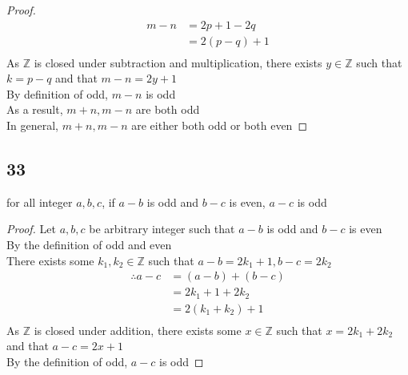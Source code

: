 \documentclass{article}
\begin{document}
\begin{proof}
    \begin{align*}
        m - n &= 2p + 1 - 2q\tag{By substitution}\\
        &= 2(p-q) +1\tag{By algebra}\\
    \end{align*}
    As $\mathbb{Z}$  is closed under subtraction and multiplication, there exists $y \in \mathbb{Z}$ such that $k = p-q$ and that $m - n = 2y + 1$\\
    By definition of odd, $m - n$ is odd\\
    As a result, $m+n,m-n$ are both odd\\
    In general, $m+n,m-n$ are either both odd or both even
\end{proof}

\subsection{33}
for all integer $a,b,c$, if $a-b$ is odd and $b-c$ is even, $a-c$ is odd
\begin{proof}
    Let $a,b,c$ be arbitrary integer such that $a-b$ is odd and $b-c$ is even\\
    By the definition of odd and even\\
    There exists some $k_1,k_2 \in \mathbb{Z}$ such that $a-b = 2k_1 + 1, b-c = 2k_2$\\
    \begin{align*}
        \therefore
        a-c &= (a-b) + (b-c) \tag{By algebra}\\
        &= 2k_1 + 1 + 2k_2 \tag{By substitution}\\
        &= 2(k_1 + k_2) + 1 \tag{By algebra}\\
    \end{align*}
    As $\mathbb{Z}$ is closed under addition, there exists some $x \in \mathbb{Z}$ such that $x = 2k_1 + 2k_2$ and that $a-c = 2x +1$\\
    By the definition of odd, $a-c$ is odd
\end{proof}
\end{document}
